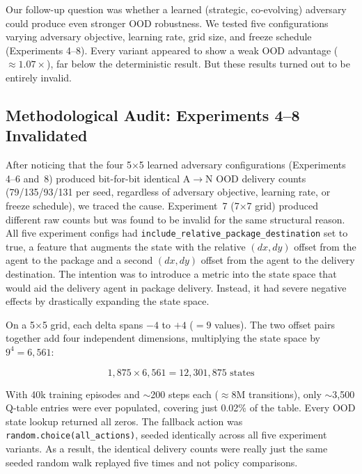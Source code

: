 \documentclass[sigconf]{aamas}
\DeclareRobustCommand{\codepath}[1]{\nolinkurl{#1}}
\begin{document}
Our follow-up question was whether a learned (strategic, co-evolving)
adversary could produce even stronger OOD robustness. We tested five configurations
varying adversary objective, learning rate, grid size, and freeze schedule
(Experiments 4--8). Every variant appeared to show a weak OOD advantage ($\approx
1.07\times$), far below the deterministic result. But these results turned out to be entirely invalid.

\subsection{Methodological Audit: Experiments 4--8 Invalidated}
\label{sec:audit}

After noticing that the four 5$\times$5 learned adversary configurations (Experiments 4--6
and~8) produced bit-for-bit identical A$\to$N OOD delivery counts
(79/135/93/131 per seed, regardless of adversary objective, learning rate, or
freeze schedule), we traced the cause. Experiment~7 (7$\times$7 grid) produced
different raw counts but was found to be invalid for the same structural reason.
All five experiment configs had \codepath{include_relative_package_destination}
set to true, a feature that augments the state with the relative $(dx, dy)$ offset from
the agent to the package and a second $(dx, dy)$ offset from the agent to the
delivery destination. The intention was to introduce a metric into the state space that would aid the delivery agent in package delivery. Instead, it had severe negative effects by drastically expanding the state space.

On a 5$\times$5 grid, each delta spans $-4$ to $+4$ ($= 9$ values). The two offset
pairs together add four independent dimensions, multiplying the state space by
$9^4 = 6{,}561$:

\[
  1{,}875 \times 6{,}561 = 12{,}301{,}875 \text{ states}
\]

With 40k training episodes and $\sim$200 steps each ($\approx 8$M transitions), only
$\sim$3,500 Q-table entries were ever populated, covering just 0.02\% of the table.
Every OOD state lookup returned all zeros. The fallback action was
\codepath{random.choice(all_actions)}, seeded identically across all five experiment
variants. As a result, the identical delivery counts were really just the
same seeded random walk replayed five times and not policy comparisons.
\end{document}

